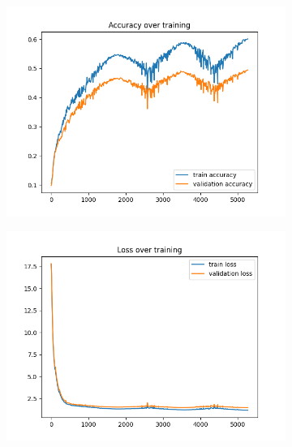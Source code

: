 \documentclass[a4paper]{article}
\begin{document}
\begin{figure}[h]
	\centering
	\begin{subfigure}{0.3\textwidth}
		\centering
		\includegraphics[width=\linewidth]{images/model_of_ex4_fliping__acc.png}
		\caption{}
	\end{subfigure}
	\begin{subfigure}{0.3\textwidth}
		\centering
		\includegraphics[width=\linewidth]{images/model_of_ex4_fliping__loss.png}
		\caption{}
	\end{subfigure}
	\begin{subfigure}{0.3\textwidth}
		\centering

\end{subfigure}
\end{figure}
\end{document}
